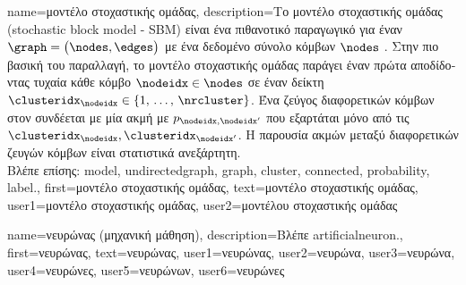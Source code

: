 {name={\foreignlanguage{greek}{μοντέλο στοχαστικής ομάδας}},
	description={\foreignlanguage{greek}{Το μοντέλο στοχαστικής ομάδας}
		(sto\-chastic block model - SBM) \cite{holland1983stochastic} \foreignlanguage{greek}{είναι ένα πιθανοτικό παραγωγικό}  
		\foreignlanguage{greek}{για έναν}  $\graph = \big( \nodes, \edges \big)$ 
		\foreignlanguage{greek}{με ένα δεδομένο σύνολο κόμβων} $\nodes$ \cite{AbbeSBM2018}. \foreignlanguage{greek}{Στην πιο 
		βασική του παραλλαγή, το μοντέλο στοχαστικής ομάδας παράγει έναν}  
		\foreignlanguage{greek}{πρώτα αποδίδοντας τυχαία κάθε κόμβο $\nodeidx \in \nodes$ σε έναν δείκτη} 
		 $\clusteridx_{\nodeidx} \in \{1, \,\ldots, \,\nrcluster\}$. \foreignlanguage{greek}{Ένα ζεύγος διαφορετικών 
		κόμβων στον}  \foreignlanguage{greek}{συνδέεται με μία ακμή με}  $p_{\nodeidx,\nodeidx'}$ 
		\foreignlanguage{greek}{που εξαρτάται μόνο από τις}  $\clusteridx_{\nodeidx}, \clusteridx_{\nodeidx'}$. 
		\foreignlanguage{greek}{Η παρουσία ακμών μεταξύ διαφορετικών ζευγών κόμβων είναι στατιστικά ανεξάρτητη.} 
		\\
		\foreignlanguage{greek}{Βλέπε επίσης:} \gls{model}, \gls{undirectedgraph}, \gls{graph}, \gls{cluster}, \gls{connected}, \gls{probability}, \gls{label}.},
	first={\foreignlanguage{greek}{μοντέλο στοχαστικής ομάδας}},
	text={\foreignlanguage{greek}{μοντέλο στοχαστικής ομάδας}},
	user1={\foreignlanguage{greek}{μοντέλο στοχαστικής ομάδας}}, %
    	user2={\foreignlanguage{greek}{μοντέλου στοχαστικής ομάδας}} %
}

{name={\foreignlanguage{greek}{νευρώνας (μηχανική μάθηση)}},
	description={\foreignlanguage{greek}{Βλέπε} \gls{artificialneuron}.},
	first={\foreignlanguage{greek}{νευρώνας}},
	text={\foreignlanguage{greek}{νευρώνας}},
	user1={\foreignlanguage{greek}{νευρώνας}}, %
	user2={\foreignlanguage{greek}{νευρώνα}}, %
	user3={\foreignlanguage{greek}{νευρώνα}}, %
	user4={\foreignlanguage{greek}{νευρώνες}}, %
	user5={\foreignlanguage{greek}{νευρώνων}}, %
	user6={\foreignlanguage{greek}{νευρώνες}} %
}

